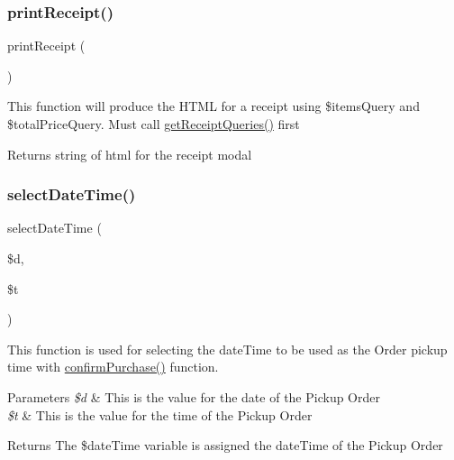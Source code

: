 \subsubsection{\texorpdfstring{printReceipt()}{printReceipt()}}
{\footnotesize\ttfamily print\+Receipt (\begin{DoxyParamCaption}{ }\end{DoxyParamCaption})}

This function will produce the H\+T\+ML for a receipt using \$items\+Query and \$total\+Price\+Query. Must call \mbox{\hyperlink{_pickup___order___selection_8class_8php_afea91457e1886d995f1a6de7439ceaeb}{get\+Receipt\+Queries()}} first \begin{DoxyReturn}{Returns}
string of html for the receipt modal 
\end{DoxyReturn}
\mbox{\label{_pickup___order___selection_8class_8php_a6481f7053a635ccc85738d41bc186de2}} 
\subsubsection{\texorpdfstring{selectDateTime()}{selectDateTime()}}
{\footnotesize\ttfamily select\+Date\+Time (\begin{DoxyParamCaption}\item[{}]{\$d,  }\item[{}]{\$t }\end{DoxyParamCaption})}

This function is used for selecting the date\+Time to be used as the Order pickup time with \mbox{\hyperlink{_pickup___order___selection_8class_8php_a539ea0c001b23b8d52ffadcec3bc3174}{confirm\+Purchase()}} function. 
\begin{DoxyParams}{Parameters}
{\em \$d} & This is the value for the date of the Pickup Order \\
\hline
{\em \$t} & This is the value for the time of the Pickup Order \\
\hline
\end{DoxyParams}
\begin{DoxyReturn}{Returns}
The \$date\+Time variable is assigned the date\+Time of the Pickup Order 
\end{DoxyReturn}
\mbox{\label{_pickup___order___selection_8class_8php_ab30920ac61f282a414092277587a25a1}} 
